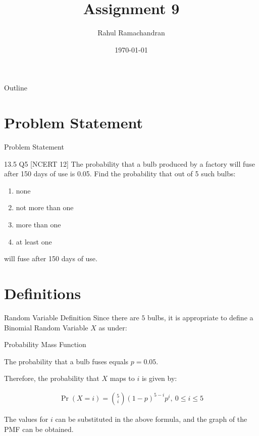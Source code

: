 \documentclass{beamer}
\title{Assignment 9}
\author{Rahul Ramachandran}
\date{\today}
\providecommand{\pr}[1]{\ensuremath{\Pr\left(#1\right)}}
\begin{document}
\begin{frame}
    \titlepage 
\end{frame}

\logo{}


\begin{frame}{Outline}
    \tableofcontents
\end{frame}



\section{Problem Statement}
\begin{frame}{Problem Statement}
    \begin{block}{13.5 Q5 [NCERT 12] } The probability that a bulb produced by a factory will fuse after 150 days of use is 0.05. Find the probability that out of 5 such bulbs:
    \begin{enumerate}[label=(\roman*)]
	\item none
	\item not more than one
	\item more than one
	\item at least one
	\end{enumerate}
	will fuse after 150 days of use.
    \end{block}
\end{frame}

\section{Definitions}
\begin{frame}{Random Variable Definition}
Since there are $5$ bulbs, it is appropriate to define a Binomial Random Variable $X$ as under:


\begin{table}[ht!]
    \centering
    
    \caption{Random Variable $X$}
	\label{table:table1}
\end{table}

\end{frame}

\begin{frame}{Probability Mass Function}

The probability that a bulb fuses equals $p=0.05$.

Therefore, the probability that $X$ maps to $i$ is given by:
\begin{block}{}
       \begin{align}
                \label{eq1}
           \pr{X=i} = \binom{5}{i} (1-p)^{5-i} p^i ,~ 0 \le i \le 5 
       \end{align}
\end{block}

The values for $i$ can be substituted in the above formula, and the graph of the PMF can be obtained.
\end{frame}
\end{document}
